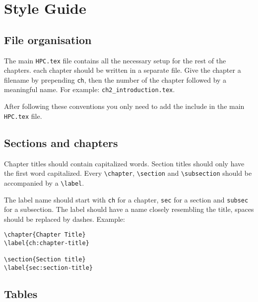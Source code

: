 \documentclass[11pt,a4paper,oneside]{book}
\begin{document}
\chapter{Style Guide}
\label{ch:style-guide}

\section{File organisation}
\label{sec:file-organisation}

The main \texttt{HPC.tex} file contains all the necessary setup for the rest of
the chapters. each chapter should be written in a separate file. Give the
chapter a filename by prepending \texttt{ch}, then the number of the chapter
followed by a meaningful name. For example: \texttt{ch2\_introduction.tex}.

After following these conventions you only need to add the include in the main
\texttt{HPC.tex} file.

\section{Sections and chapters}
\label{sec:sections-and-chapters}

Chapter titles should contain capitalized words. Section titles should only
have the first word capitalized.  Every \texttt{\textbackslash{}chapter},
\texttt{\textbackslash{}section} and \texttt{\textbackslash{}subsection} should
be accompanied by a \texttt{\textbackslash{}label}.

The label name should start with \texttt{ch} for a chapter, \texttt{sec} for a
section and \texttt{subsec} for a subsection. The label should have a name
closely resembling the title, spaces should be replaced by dashes. Example:

\begin{verbatim}
\chapter{Chapter Title}
\label{ch:chapter-title}

\section{Section title}
\label{sec:section-title}
\end{verbatim}

\section{Tables}
\label{sec:tables}
\end{document}

